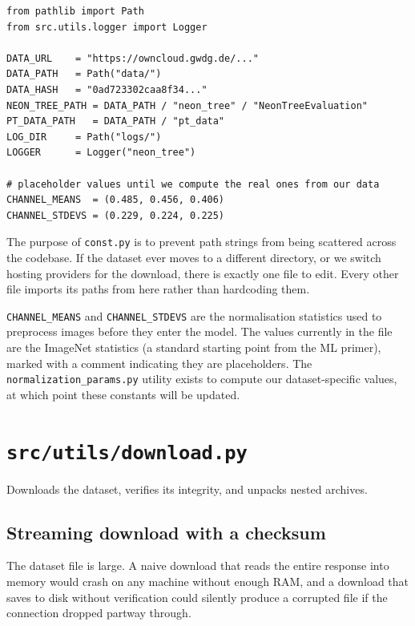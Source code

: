 \documentclass[11pt, a4paper]{article}
\newenvironment{filebox}[1]{%
  \begin{tcolorbox}[
    colback=filebg, colframe=fileframe,
    fonttitle=\bfseries\ttfamily, title=#1,
    breakable, enhanced
  ]
}{%
  \end{tcolorbox}
}
\begin{document}
\begin{lstlisting}
from pathlib import Path
from src.utils.logger import Logger

DATA_URL    = "https://owncloud.gwdg.de/..."
DATA_PATH   = Path("data/")
DATA_HASH   = "0ad723302caa8f34..."
NEON_TREE_PATH = DATA_PATH / "neon_tree" / "NeonTreeEvaluation"
PT_DATA_PATH   = DATA_PATH / "pt_data"
LOG_DIR     = Path("logs/")
LOGGER      = Logger("neon_tree")

# placeholder values until we compute the real ones from our data
CHANNEL_MEANS  = (0.485, 0.456, 0.406)
CHANNEL_STDEVS = (0.229, 0.224, 0.225)
\end{lstlisting}

The purpose of \texttt{const.py} is to prevent path strings from being
scattered across the codebase. If the dataset ever moves to a different
directory, or we switch hosting providers for the download, there is exactly
one file to edit. Every other file imports its paths from here rather than
hardcoding them.

\texttt{CHANNEL\_MEANS} and \texttt{CHANNEL\_STDEVS} are the normalisation
statistics used to preprocess images before they enter the model. The values
currently in the file are the ImageNet statistics (a standard starting point
from the ML primer), marked with a comment indicating they are placeholders.
The \texttt{normalization\_params.py} utility exists to compute our
dataset-specific values, at which point these constants will be updated.

\section{\texttt{src/utils/download.py}}

\begin{filebox}{src/utils/download.py}
  Downloads the dataset, verifies its integrity, and unpacks nested archives.
\end{filebox}

\subsection{Streaming download with a checksum}

The dataset file is large. A naive download that reads the entire response
into memory would crash on any machine without enough RAM, and a download that
saves to disk without verification could silently produce a corrupted file if
the connection dropped partway through.
\end{document}
